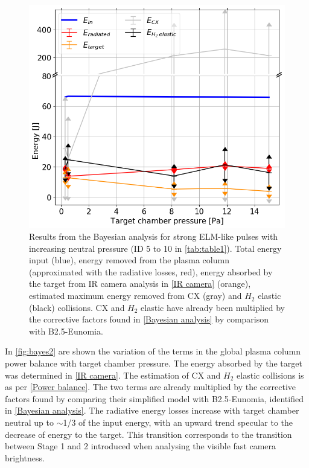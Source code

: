 \begin{figure}[!ht]
        \centering
    	\includegraphics[width=0.7\linewidth,trim={0 0 0 5},clip]{Chapters/chapter3/figs/bayesian_strong_3b.png}
	\caption{Results from the Bayesian analysis for strong ELM-like pulses with increasing neutral pressure (ID 5 to 10 in \autoref{tab:table1}). Total energy input (blue), energy removed from the plasma column (approximated with the radiative losses, red), energy absorbed by the target from IR camera analysis in \autoref{IR camera} (orange), estimated maximum energy removed from CX (gray) and $H_2$ elastic (black) collisions. CX and $H_2$ elastic have already been multiplied by the corrective factors found in \autoref{Bayesian analysis} by comparison with B2.5-Eunomia.}
	\label{fig:bayes2}
\end{figure}

In \autoref{fig:bayes2} are shown the variation of the terms in the global plasma column power balance with target chamber pressure. The energy absorbed by the target was determined in \autoref{IR camera}. The estimation of CX and $H_2$ elastic collisions is as per \autoref{Power balance}. The two terms are already multiplied by the corrective factors found by comparing their simplified model with B2.5-Eunomia, identified in \autoref{Bayesian analysis}. The radiative energy losses increase with target chamber neutral up to $\sim$1/3 of the input energy, with an upward trend specular to the decrease of energy to the target. This transition corresponds to the transition between Stage 1 and 2 introduced when analysing the visible fast camera brightness.

